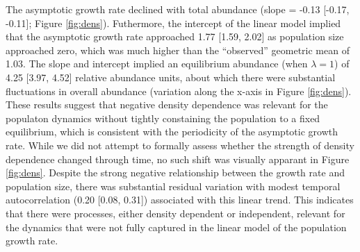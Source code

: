 The asymptotic growth rate declined with total abundance
(slope = -0.13 [-0.17, -0.11]; Figure \ref{fig:dens}).
Futhermore, 
the intercept of the linear model implied that 
the asymptotic growth rate approached 1.77 [1.59, 2.02] 
as population size approached zero,
which was much higher than the ``observed'' geometric mean of 1.03.
The slope and intercept implied an equilibrium abundance (when $\lambda=1$)
of 4.25 [3.97, 4.52] relative abundance units,
about which there were substantial fluctuations in overall abundance 
(variation along the x-axis in Figure \ref{fig:dens}).
These results suggest that negative density dependence was relevant for the populaton
dynamics without tightly constaining the population to a fixed equilibrium,
which is consistent with the periodicity of the asymptotic growth rate.
While we did not attempt to formally assess whether the strength of density dependence
changed through time,
no such shift was visually apparant in Figure \ref{fig:dens}.
Despite the strong negative relationship between the growth rate and population size, 
there was substantial residual variation with modest
temporal autocorrelation (0.20 [0.08, 0.31]) associated with this linear trend.
This indicates that there were processes, either density dependent or independent,
relevant for the dynamics 
that were not fully captured in the linear model of the population growth rate.

